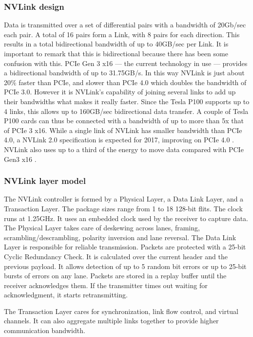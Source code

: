 \subsubsection{NVLink design}
Data is transmitted over a set of differential pairs with a bandwidth of 20Gb/sec each pair.
A total of 16 pairs form a Link, with 8 pairs for each direction.
This results in a total bidirectional bandwidth of up to 40GB/sec per Link.
It is important to remark that this is bidirectional because there has been some confusion with this.
PCIe Gen 3 x16 --- the current technology in use --- provides a bidirectional bandwidth of up to 31.75GB/s.
In this way NVLink is just about 20\% faster than PCIe, and slower than PCIe 4.0 which doubles the bandwidth of PCIe 3.0.
However it is NVLink's capability of joining several links to add up their bandwidths what makes it really faster.
Since the Tesla P100 supports up to 4 links, this allows up to 160GB/sec bidirectional data transfer.
A couple of Tesla P100 cards can thus be connected with a bandwidth of up to more than 5x that of PCIe 3 x16.
While a single link of NVLink has smaller bandwidth than PCIe 4.0, a NVLink 2.0 specification is expected for 2017, improving on PCIe 4.0 \cite{nextplatform:nvlink}.
NVLink also uses up to a third of the energy to move data compared with PCIe Gen3 x16 \cite{nvidia:hpcnvlink}.

\subsubsection{NVLink layer model}
The NVLink controller is formed by a Physical Layer, a Data Link Layer, and a Transaction Layer.
The package sizes range from 1 to 18 128-bit flits.
The clock runs at 1.25GHz.
It uses an embedded clock used by the receiver to capture data.
The Physical Layer takes care of deskewing across lanes, framing, scrambling/descrambling, polarity inversion and lane reversal.
The Data Link Layer is responsible for reliable transmission.
Packets are protected with a 25-bit Cyclic Redundancy Check.
It is calculated over the current header and the previous payload.
It allows detection of up to 5 random bit errors or up to 25-bit bursts of errors on any lane.
Packets are stored in a replay buffer until the receiver acknowledges them.
If the transmitter times out waiting for acknowledgment, it starts retransmitting.

The Transaction Layer cares for synchronization, link flow control, and virtual channels.
It can also aggregate multiple links together to provide higher communication bandwidth.

